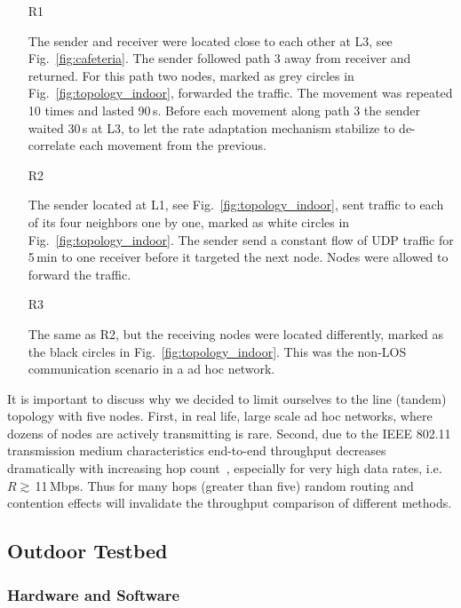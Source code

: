 \documentclass[11pt,draftclsnofoot,journal,onecolumn]{IEEEtran}
\begin{document}
\begin{itemize}

\item[R1]

The sender and receiver were located close to each other at L3, see Fig.~\ref{fig:cafeteria}. The sender followed path 3 away from receiver and returned. For this path two nodes, marked as grey circles in Fig.~\ref{fig:topology_indoor}, forwarded the traffic. The movement was repeated 10 times and lasted 90\,s. Before each movement along path 3 the sender waited 30\,s at L3, to let the rate adaptation mechanism stabilize to de-correlate each movement from the previous.

\item[R2]

The sender located at L1, see Fig.~\ref{fig:topology_indoor}, sent traffic to each of its four neighbors one by one, marked as white circles in Fig.~\ref{fig:topology_indoor}.  The sender send a constant flow of UDP traffic for 5\,min to one receiver before it targeted the next node. Nodes were allowed to forward the traffic. 

\item[R3]

The same as R2, but the receiving nodes were located differently, marked as the black circles in Fig.~\ref{fig:topology_indoor}. This was the non-LOS communication scenario in a ad hoc network. 
\end{itemize}

It is important to discuss why we decided to limit ourselves to the line (tandem) topology with five nodes. First, in real life, large scale ad hoc networks, where dozens of nodes are actively transmitting is rare. Second, due to the IEEE 802.11 transmission medium characteristics end-to-end throughput decreases dramatically with increasing hop count~\cite{Li_Ciit_2004}, especially for very high data rates, i.e. $R\gtrsim$\,11\,Mbps. Thus for many hops (greater than five) random routing and contention effects will invalidate the throughput comparison of different methods.

\subsection{Outdoor Testbed}
\label{sec:outdoor_testbed}

\subsubsection{Hardware and Software}
\label{sec:hardware_outdoor}
\end{document}
